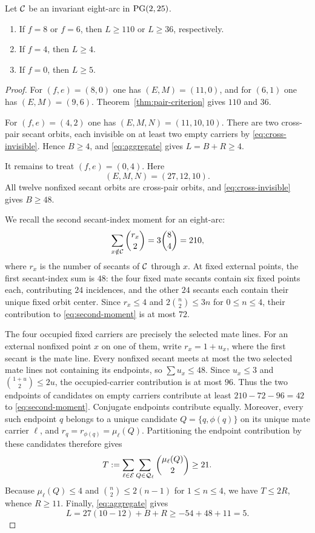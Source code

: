 \begin{proposition}
\label{prop:four-profiles}
Let $\mathcal{C}$ be an invariant eight-arc in $\operatorname{PG}(2,25)$.
\begin{enumerate}[label=(\alph*),leftmargin=2em]
\item If $f=8$ or $f=6$, then $L\ge110$ or $L\ge36$, respectively.
\item If $f=4$, then $L\ge4$.
\item If $f=0$, then $L\ge5$.
\end{enumerate}
\end{proposition}

\begin{proof}
For $(f,e)=(8,0)$ one has $(E,M)=(11,0)$, and for $(6,1)$ one has
$(E,M)=(9,6)$.  Theorem~\ref{thm:pair-criterion} gives $110$ and $36$.

For $(f,e)=(4,2)$ one has $(E,M,N)=(11,10,10)$.  There are two cross-pair
secant orbits, each invisible on at least two empty carriers by
\eqref{eq:cross-invisible}.  Hence $B\ge4$, and
\eqref{eq:aggregate} gives $L=B+R\ge4$.

It remains to treat $(f,e)=(0,4)$.  Here
\[
  (E,M,N)=(27,12,10).
\]
All twelve nonfixed secant orbits are cross-pair orbits, and
\eqref{eq:cross-invisible} gives $B\ge48$.

We recall the second secant-index moment for an eight-arc:
\begin{equation}\label{eq:second-moment}
  \sum_{x\notin\mathcal{C}}\binom{r_x}{2}=3\binom84=210,
\end{equation}
where $r_x$ is the number of secants of $\mathcal{C}$ through $x$.  At fixed
external points, the first secant-index sum is $48$: the four fixed mate
secants contain six fixed points each, contributing $24$ incidences, and
the other $24$ secants each contain their unique fixed orbit center.  Since $r_x\le4$ and
$2\binom n2\le3n$ for $0\le n\le4$, their contribution to
\eqref{eq:second-moment} is at most $72$.

The four occupied fixed carriers are precisely the selected mate lines.
For an external nonfixed point $x$ on one of them, write $r_x=1+u_x$, where
the first secant is the mate line.  Every nonfixed secant meets at most the
two selected mate lines not containing its endpoints, so
$\sum u_x\le48$.  Since $u_x\le3$ and
$\binom{1+u}{2}\le2u$, the occupied-carrier contribution is at most $96$.
Thus the two endpoints of candidates on empty carriers contribute at least
$210-72-96=42$ to \eqref{eq:second-moment}.  Conjugate endpoints contribute
equally.  Moreover, every such endpoint $q$ belongs to a unique candidate
$Q=\{q,\phi(q)\}$ on its unique mate carrier $\ell$, and
$r_q=r_{\phi(q)}=\mu_\ell(Q)$.  Partitioning the endpoint contribution by
these candidates therefore gives
\[
  T:=\sum_{\ell\in\mathcal{E}}\sum_{Q\in\mathcal{Q}_\ell}
       \binom{\mu_\ell(Q)}2\ge21.
\]
Because $\mu_\ell(Q)\le4$ and
$\binom n2\le2(n-1)$ for $1\le n\le4$, we have $T\le2R$, whence $R\ge11$.
Finally, \eqref{eq:aggregate} gives
\[
  L=27(10-12)+B+R\ge-54+48+11=5.
\]
\end{proof}

